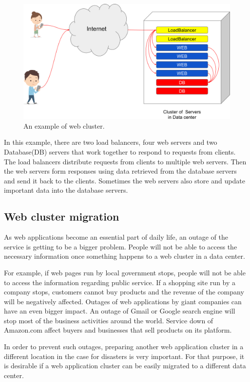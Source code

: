 \begin{figure}[h]
\begin{center}
\includegraphics[width=0.8\columnwidth]{Figs/web_cluster.png}
\end{center}
\caption{
An example of web cluster.
}
\label{fig:web_cluster}
\end{figure}

In this example, there are two load balancers, four web servers and two Database(DB) servers that work together to respond to requests from clients.
The load balancers distribute requests from clients to multiple web servers.
Then the web servers form responses using data retrieved from the database servers and send it back to the clients.
Sometimes the web servers also store and update important data into the database servers.

\subsection{Web cluster migration}

As web applications become an essential part of daily life, an outage of the service is getting to be a bigger problem.
People will not be able to access the necessary information once something happens to a web cluster in a data center.

For example, if web pages run by local government stops, people will not be able to access the information regarding public service.
If a shopping site run by a company stops, customers cannot buy products and the revenue of the company will be negatively affected.
Outages of web applications by giant companies can have an even bigger impact.
An outage of Gmail or Google search engine will stop most of the business activities around the world.
Service down of Amazon.com affect buyers and businesses that sell products on its platform.

In order to prevent such outages, preparing another web application cluster in a different location in the case for disasters is very important.
For that purpose, it is desirable if a web application cluster can be easily migrated to a different data center.

